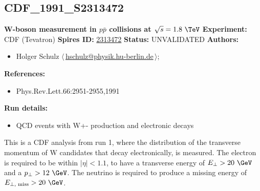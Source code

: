 \subsection[CDF\_1991\_S2313472]{CDF\_1991\_S2313472\,\cite{Abe:1991rk}}
\textbf{W-boson \pT measurement in $p\bar{p}$ collisions at $\sqrt{s}=1.8~\TeV$}\newline
\textbf{Experiment:} CDF (Tevatron) \newline
\textbf{Spires ID:} \href{http://www.slac.stanford.edu/spires/find/hep/www?rawcmd=key+2313472}{2313472}\newline
\textbf{Status:} UNVALIDATED\newline
\textbf{Authors:}
\begin{itemize}
  \item Holger Schulz $\langle\,$\href{mailto:hschulz@physik.hu-berlin.de}{hschulz@physik.hu-berlin.de}$\,\rangle$;
\end{itemize}
\textbf{References:}
\begin{itemize}
  \item Phys.Rev.Lett.66:2951-2955,1991
\end{itemize}
\textbf{Run details:}
\begin{itemize}

  \item QCD events with W+- production and electronic decays\end{itemize}

\noindent This is a CDF analysis from run 1, where the distribution of the transverse momentum of W candidates that decay  electronically, is measured. The  electron is required to be within $\left|\eta\right| < 1.1$, to have a transverse energy of $E_\perp > 20~\GeV$ and a $p_\perp > 12~\GeV$. The neutrino is required to produce a missing energy of  $E_{\perp, \text{ miss}}>20~\GeV$.

\clearpage


\clearpage

